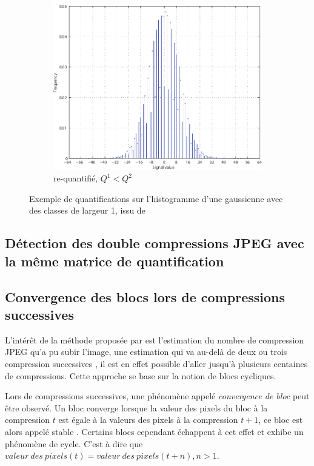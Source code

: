 \documentclass[utf8]{stageM2R} %
\begin{document}
\begin{figure}
\begin{subfigure}{.33\textwidth}
    \includegraphics[width=\linewidth]{images/h3}
    \caption{re-quantifié, $Q^{1} < Q^{2}$}
    \label{hc}
  \end{subfigure}
  \caption{Exemple de quantifications sur l'histogramme d'une gaussienne avec des classes de largeur 1, issu de \cite{feng2010jpeg}}
  \label{fig:histo}
\end{figure}

\subsection{Détection des double compressions JPEG avec la même matrice de quantification}
\cite{huang2010detecting}


\subsection{Convergence des blocs lors de compressions successives}
L'intérêt de la méthode proposée par \citeauthor{CarneinSB2016TelltaleWatermarks} \cite{CarneinSB2016TelltaleWatermarks} est l'estimation du nombre de compression JPEG qu'a pu subir l'image, une estimation qui va au-delà de deux ou trois compression successives \cite{huang2010detecting}\cite{lukavs2003estimation}, il est en effet possible d'aller jusqu'à plusieurs centaines de compressions. Cette approche se base sur la notion de blocs cycliques.

Lors de compressions successives, une phénomène appelé \textit{convergence de bloc} peut être observé. Un bloc converge lorsque la valeur des pixels du bloc à la compression $t$ est égale à la valeurs des pixels à la compression $t + 1$, ce bloc est alors appelé stable \cite{lai2013block}. Certains blocs cependant échappent à cet effet et exhibe un phénomène de cycle. C'est à dire que $valeur\ des\ pixels(t) = valeur\ des\ pixels(t + n), n > 1$.
\end{document}
